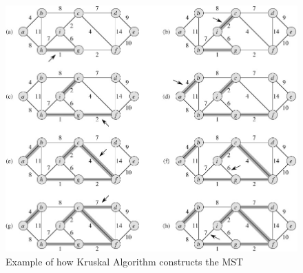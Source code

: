 \documentclass[12pt]{article}
\begin{document}
\begin{figure}[h!]
\begin{center}
\includegraphics[width=\linewidth/2]{kruskal.jpg}
  \end{center}
\caption{ Example of how Kruskal Algorithm constructs the MST }
  \label{fig}
\end{figure}



\end{document}
